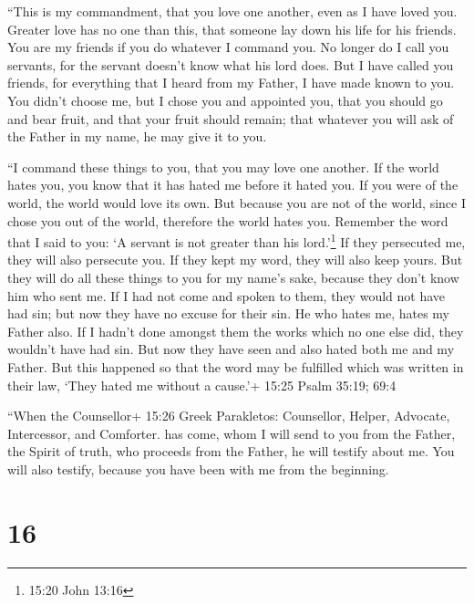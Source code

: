 ``This is my commandment, that you love one another, even
as I have loved you.  Greater love has no one than this,
that someone lay down his life for his friends.  You are my
friends if you do whatever I command you.  No longer do I
call you servants, for the servant doesn't know what his lord does. But
I have called you friends, for everything that I heard from my Father, I
have made known to you.  You didn't choose me, but I chose
you and appointed you, that you should go and bear fruit, and that your
fruit should remain; that whatever you will ask of the Father in my
name, he may give it to you.

 ``I command these things to you, that you may love one
another.  If the world hates you, you know that it has
hated me before it hated you.  If you were of the world,
the world would love its own. But because you are not of the world,
since I chose you out of the world, therefore the world hates you.
 Remember the word that I said to you: `A servant is not
greater than his lord.'\footnote{15:20 John 13:16} If they persecuted
me, they will also persecute you. If they kept my word, they will also
keep yours.  But they will do all these things to you for
my name's sake, because they don't know him who sent me. 
If I had not come and spoken to them, they would not have had sin; but
now they have no excuse for their sin.  He who hates me,
hates my Father also.  If I hadn't done amongst them the
works which no one else did, they wouldn't have had sin. But now they
have seen and also hated both me and my Father.  But this
happened so that the word may be fulfilled which was written in their
law, `They hated me without a cause.'+ 15:25 Psalm 35:19; 69:4

 ``When the Counsellor+ 15:26 Greek Parakletos: Counsellor,
Helper, Advocate, Intercessor, and Comforter. has come, whom I will send
to you from the Father, the Spirit of truth, who proceeds from the
Father, he will testify about me.  You will also testify,
because you have been with me from the beginning.

\hypertarget{section-15}{%
\section{16}\label{section-15}}

